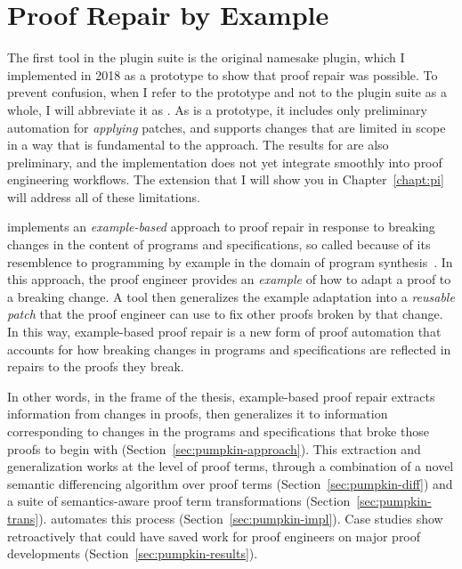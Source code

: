 \chapter{Proof Repair by Example}
\label{ch:example}

The first tool in the \sysnamelong plugin suite is the original namesake \sysnamelong plugin, which I implemented in 2018 as a prototype to show that proof repair was possible.
To prevent confusion, when I refer to the \sysnamelong prototype and not to the plugin suite as a whole, I will abbreviate it as \sysname.
As \sysname is a prototype, it includes only preliminary automation for \textit{applying} patches,
and supports changes that are limited in scope in a way that is fundamental to the approach.
The results for \sysname are also preliminary, and the implementation does not yet integrate smoothly into proof engineering workflows.
The \toolnamec extension that I will show you in Chapter~\ref{chapt:pi} will address all of these limitations.

\sysname implements an \textit{example-based} approach to proof repair in response to breaking changes in the content of programs and specifications,
so called because of its resemblence to programming by example in the domain of program synthesis~\cite{DBLP:journals/ftpl/GulwaniPS17}.
In this approach, the proof engineer provides an \textit{example} of how to adapt a proof to a breaking change.
A tool then generalizes the example adaptation into a \textit{reusable patch} that the proof engineer can use to fix other proofs broken by that change.
In this way, example-based proof repair is a new form of proof automation that accounts for how breaking changes in programs and specifications
are reflected in repairs to the proofs they break.

In other words, in the frame of the thesis, example-based proof repair extracts information from changes in proofs,
then generalizes it to information corresponding to changes in the programs and specifications that broke those proofs to begin with (Section~\ref{sec:pumpkin-approach}).
This extraction and generalization works at the level of proof terms, through a combination of a novel semantic differencing algorithm over proof terms (Section~\ref{sec:pumpkin-diff}) and 
a suite of semantics-aware proof term transformations (Section~\ref{sec:pumpkin-trans}).
\sysname automates this process (Section~\ref{sec:pumpkin-impl}).
Case studies show retroactively that \sysname could have saved work for proof engineers
on major proof developments (Section~\ref{sec:pumpkin-results}).















